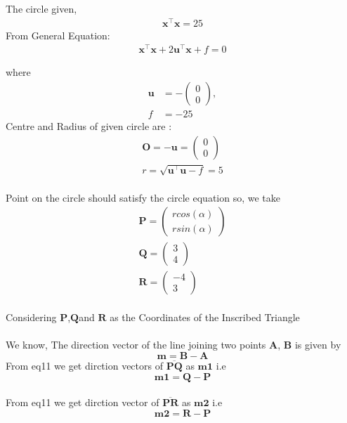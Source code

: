 \documentclass[journal,12pt,twocolumn]{article}
\newcommand{\myvec}[1]{\ensuremath{\begin{pmatrix}#1\end{pmatrix}}}
\let\vec\mathbf
\let\vec\mathbf
\begin{document}
The circle given,
 \begin{align}
    \label{eq:conic_quad_form}
    \vec{x}^{\top}\vec{x}=25
 \end{align}
From General Equation:
\begin{align}
    \label{eq:conic_quad_form}
    \vec{x}^{\top}\vec{x}+2\vec{u}^{\top}\vec{x}+f=0
    \end{align}
    
where
\begin{align}
	\label{eq:u_vector}
	\vec{u} &= -\myvec{0\\0},
	\\
	\label{eq:f_value}
	f &= -25	
\end{align}
Centre and Radius of given circle are :
\begin{align}
	\label{eq:V_matrix}
	\vec{O} = -\vec{u} = \myvec{0\\0}\\
	r = \sqrt{\vec{u}^{\top}\vec{u}-f} = 5
	 \label{eq-7} 
\end{align}
\\
Point on the circle should satisfy the circle equation so, we take 
\begin{align}
\vec{P}=\myvec{rcos(\alpha)\\
  rsin(\alpha)}\\
 \vec{Q}=\myvec{3\\
  4}\\
   \vec{R}=\myvec{-4\\
  3}
\end{align}
\\
Considering $\vec{P}$,$\vec{Q}$and $\vec{R}$ as the Coordinates of the Inscribed Triangle
\\
\\
We know,
The direction vector of the line joining two points $\vec{A}$, $\vec{B}$ is given by
\begin{equation}
	\vec{m}=
     \vec{B}-  \vec{A}
  \label{eq-11}
\end{equation}
From eq11 we get dirction vectors of $\overline{\vec{P}\vec{Q}}$ as $\vec{m1}$ i.e
\\
\begin{equation}
	\vec{m1}
 = \vec{Q}-\vec{P}
  \label{eq-12}
\end{equation}
\\
From eq11 we get dirction vector of $\overline{\vec{P}\vec{R}}$ as $\vec{m2}$ i.e
\begin{equation}
	\vec{m2}
 = \vec{R} - \vec{P}
   \label{eq-13}
\end{equation}
\\
\end{document}

